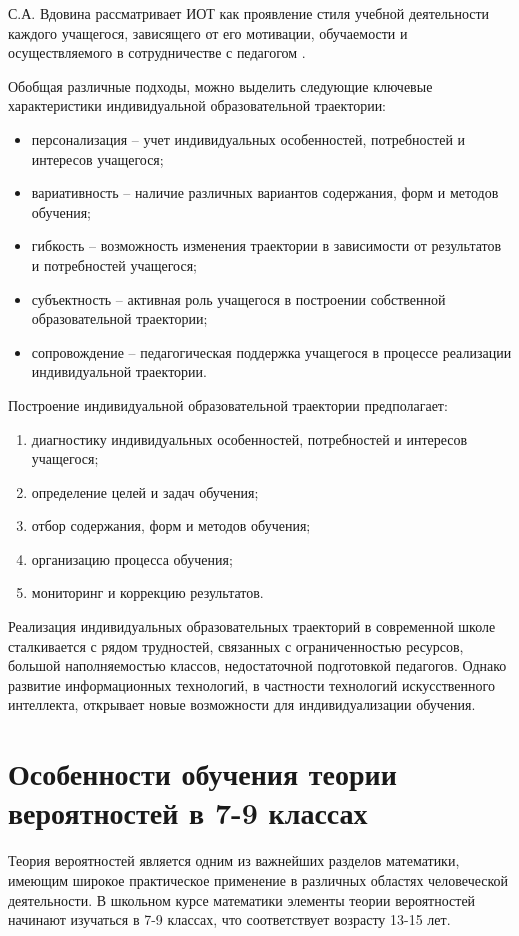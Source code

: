 \documentclass[a4paper,14pt]{extreport}
\begin{document}
С.А. Вдовина рассматривает ИОТ как проявление стиля учебной деятельности каждого учащегося, зависящего от его мотивации, обучаемости и осуществляемого в сотрудничестве с педагогом \cite{vdovina}.

Обобщая различные подходы, можно выделить следующие ключевые характеристики индивидуальной образовательной траектории:
\begin{itemize}
    \item персонализация – учет индивидуальных особенностей, потребностей и интересов учащегося;
    \item вариативность – наличие различных вариантов содержания, форм и методов обучения;
    \item гибкость – возможность изменения траектории в зависимости от результатов и потребностей учащегося;
    \item субъектность – активная роль учащегося в построении собственной образовательной траектории;
    \item сопровождение – педагогическая поддержка учащегося в процессе реализации индивидуальной траектории.
\end{itemize}

Построение индивидуальной образовательной траектории предполагает:
\begin{enumerate}
    \item диагностику индивидуальных особенностей, потребностей и интересов учащегося;
    \item определение целей и задач обучения;
    \item отбор содержания, форм и методов обучения;
    \item организацию процесса обучения;
    \item мониторинг и коррекцию результатов.
\end{enumerate}

Реализация индивидуальных образовательных траекторий в современной школе сталкивается с рядом трудностей, связанных с ограниченностью ресурсов, большой наполняемостью классов, недостаточной подготовкой педагогов. Однако развитие информационных технологий, в частности технологий искусственного интеллекта, открывает новые возможности для индивидуализации обучения.

\section{Особенности обучения теории вероятностей в 7-9 классах}

Теория вероятностей является одним из важнейших разделов математики, имеющим широкое практическое применение в различных областях человеческой деятельности. В школьном курсе математики элементы теории вероятностей начинают изучаться в 7-9 классах, что соответствует возрасту 13-15 лет.
\end{document}
